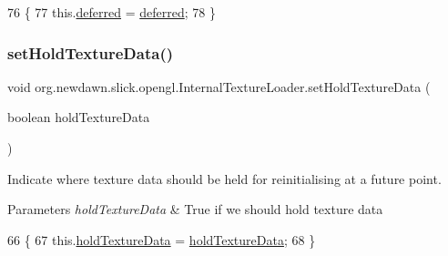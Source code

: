 \begin{DoxyCode}
76                                                      \{
77         this.\mbox{\hyperlink{classorg_1_1newdawn_1_1slick_1_1opengl_1_1_internal_texture_loader_afde58d084fb7c587c15b674005617ff4}{deferred}} = \mbox{\hyperlink{classorg_1_1newdawn_1_1slick_1_1opengl_1_1_internal_texture_loader_afde58d084fb7c587c15b674005617ff4}{deferred}};
78     \}
\end{DoxyCode}
\mbox{\label{classorg_1_1newdawn_1_1slick_1_1opengl_1_1_internal_texture_loader_aad0662c212972f36d5b0fd252934deaf}} 
\subsubsection{\texorpdfstring{set\+Hold\+Texture\+Data()}{setHoldTextureData()}}
{\footnotesize\ttfamily void org.\+newdawn.\+slick.\+opengl.\+Internal\+Texture\+Loader.\+set\+Hold\+Texture\+Data (\begin{DoxyParamCaption}\item[{boolean}]{hold\+Texture\+Data }\end{DoxyParamCaption})\hspace{0.3cm}{\ttfamily [inline]}}

Indicate where texture data should be held for reinitialising at a future point.


\begin{DoxyParams}{Parameters}
{\em hold\+Texture\+Data} & True if we should hold texture data \\
\hline
\end{DoxyParams}

\begin{DoxyCode}
66                                                             \{
67         this.\mbox{\hyperlink{classorg_1_1newdawn_1_1slick_1_1opengl_1_1_internal_texture_loader_a45b8c17af18ad5095972b3f519eb17bd}{holdTextureData}} = \mbox{\hyperlink{classorg_1_1newdawn_1_1slick_1_1opengl_1_1_internal_texture_loader_a45b8c17af18ad5095972b3f519eb17bd}{holdTextureData}};
68     \}
\end{DoxyCode}


